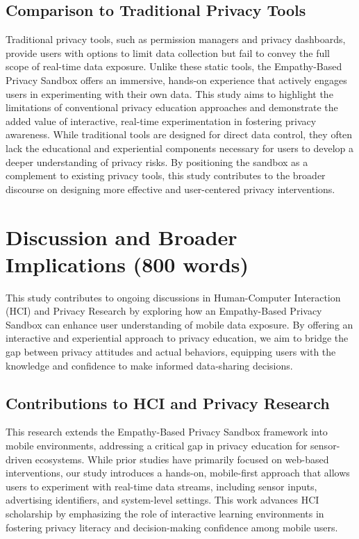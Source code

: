 \documentclass[acmlarge, nonacm]{acmart}
\begin{document}
\subsection{Comparison to Traditional Privacy Tools}
Traditional privacy tools, such as permission managers and privacy dashboards, provide users with options to limit data collection but fail to convey the full scope of real-time data exposure. Unlike these static tools, the Empathy-Based Privacy Sandbox offers an immersive, hands-on experience that actively engages users in experimenting with their own data. This study aims to highlight the limitations of conventional privacy education approaches and demonstrate the added value of interactive, real-time experimentation in fostering privacy awareness. While traditional tools are designed for direct data control, they often lack the educational and experiential components necessary for users to develop a deeper understanding of privacy risks. By positioning the sandbox as a complement to existing privacy tools, this study contributes to the broader discourse on designing more effective and user-centered privacy interventions.

\section{Discussion and Broader Implications (800 words)}

This study contributes to ongoing discussions in Human-Computer Interaction (HCI) and Privacy Research by exploring how an Empathy-Based Privacy Sandbox can enhance user understanding of mobile data exposure. By offering an interactive and experiential approach to privacy education, we aim to bridge the gap between privacy attitudes and actual behaviors, equipping users with the knowledge and confidence to make informed data-sharing decisions.

\subsection{Contributions to HCI and Privacy Research}

This research extends the Empathy-Based Privacy Sandbox framework into mobile environments, addressing a critical gap in privacy education for sensor-driven ecosystems. While prior studies have primarily focused on web-based interventions, our study introduces a hands-on, mobile-first approach that allows users to experiment with real-time data streams, including sensor inputs, advertising identifiers, and system-level settings. This work advances HCI scholarship by emphasizing the role of interactive learning environments in fostering privacy literacy and decision-making confidence among mobile users.
\end{document}
